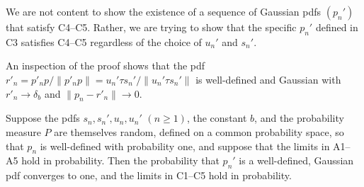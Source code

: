 \begin{remark} \label{r:pn-exist} We are not content to show the existence of a sequence of Gaussian pdfs $(p_n')$ that satisfy C4--C5. Rather, we are trying to show that the specific $p_n'$ defined in C3 satisfies C4--C5 regardless of the choice of $u_n'$ and $s_n'$.
\end{remark}
\begin{remark} \label{r:pn-rn} An inspection of the proof shows that the pdf $r'_n = p'_np/\|p'_np\| = u_n'\tau s_n'/\|u_n'\tau s_n'\|$ is well-defined and Gaussian with $r'_n\to\delta_b$ and $\|p_n-r'_n\|\to 0$.
\end{remark}
\begin{remark} \label{r:pn-prob} Suppose the pdfs $s_n,s_n',u_n,u_n'$ $(n\geq 1)$, the constant $b$, and the probability measure $P$ are themselves random, defined on a common probability space, so that $p_n$ is well-defined with probability one, and suppose that the limits in A1--A5 hold in probability. Then the probability that $p_n'$ is a well-defined, Gaussian pdf converges to one, and the limits in C1--C5 hold in probability.
\end{remark}

